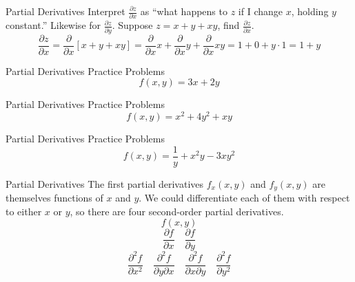 \documentclass[aspectratio=169]{beamer}
\begin{document}
\begin{frame}{Partial Derivatives}\label{main1}
    Interpret $\frac{\partial z}{\partial x}$ as “what happens to $z$ if I change $x$, holding $y$ constant.” Likewise for $\frac{\partial z}{\partial y}$.
 	Suppose $z = x + y + xy$, find $\frac{\partial z}{\partial x}$.
    \[
    \frac{\partial z}{\partial x} = \frac{\partial}{\partial x} [x + y + xy] = \frac{\partial}{\partial x} x + \frac{\partial}{\partial x} y + \frac{\partial}{\partial x} xy = 1 + 0 + y \cdot 1 = 1 + y
    \]
\end{frame}

\begin{frame}{Partial Derivatives Practice Problems}
    \vspace{-4cm}
    \[
    f(x, y) = 3x + 2y
    \]
\end{frame}

\begin{frame}{Partial Derivatives Practice Problems}
    \vspace{-4cm}
    \[
    f(x, y) = x^2 + 4y^2 + xy
    \]
\end{frame}

\begin{frame}{Partial Derivatives Practice Problems}
    \vspace{-4cm}
    \[
    f(x, y) = \frac{1}{y} + x^2y - 3xy^2
    \]
\end{frame}

\begin{frame}{Partial Derivatives}\label{main1}
    The first partial derivatives $f_x(x, y)$ and $f_y(x, y)$ are themselves functions of $x$ and $y$. We could differentiate each of them with respect to either $x$ or $y$, so there are four second-order partial derivatives.
    \[
    f(x, y)
    \]
    \[
    \frac{\partial f}{\partial x} \quad \frac{\partial f}{\partial y}
    \]
    \[
    \frac{\partial^2 f}{\partial x^2} \quad \frac{\partial^2 f}{\partial y \partial x} \quad \frac{\partial^2 f}{\partial x \partial y} \quad \frac{\partial^2 f}{\partial y^2}
    \]

\end{frame}
\end{document}
